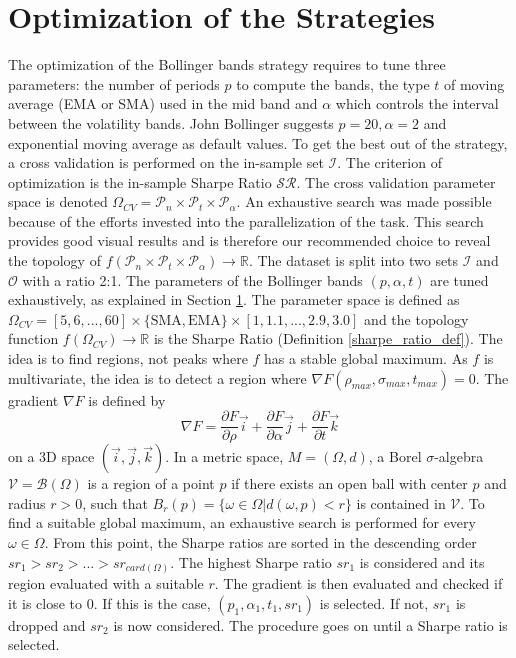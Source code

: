 \documentclass[11pt,a4,twosided,singlespacing,titlepagenumber=on]{scrreprt}
\numberwithin{equation}{chapter} %
\theoremstyle{remark}
\begin{document}
\section{Optimization of the Strategies}
\label{sec:optimization_strategy}
The optimization of the Bollinger bands strategy requires to tune three parameters: the number of periods $p$ to compute the bands, the type $t$ of moving average (EMA or SMA) used in the mid band and $\alpha$ which controls the interval between the volatility bands. John Bollinger suggests $p = 20, \alpha = 2$ and exponential moving average as default values. To get the best out of the strategy, a cross validation is performed on the in-sample set $\mathcal{I}$. The criterion of optimization is the in-sample Sharpe Ratio $\mathcal{SR}$. The cross validation parameter space is denoted  $\Omega_{CV} = \mathcal{P}_n \times \mathcal{P}_t \times \mathcal{P}_\alpha$. An exhaustive search was made possible because of the efforts invested into the parallelization of the task. This search provides good visual results and is therefore our recommended choice to reveal the topology of $f(\mathcal{P}_n \times \mathcal{P}_t \times \mathcal{P}_\alpha) \rightarrow \mathbb{R}$. The dataset is split into two sets $\mathcal{I}$ and $\mathcal{O}$ with a ratio 2:1. The parameters of the Bollinger bands $(p, \alpha, t)$ are tuned exhaustively, as explained in Section \ref{sec:optimization_strategy}. The parameter space is defined as $\Omega_{CV}  = [5,6,...,60] \times \{\text{SMA}, \text{EMA}\} \times [1,1.1,...,2.9,3.0]$ and the topology function $f(\Omega_{CV}) \rightarrow \mathbb{R}$ is the Sharpe Ratio (Definition \ref{sharpe_ratio_def}). The idea is to find regions, not peaks where $f$ has a stable global maximum. As $f$ is multivariate, the idea is to detect a region where $\nabla F(\rho_{max}, \sigma_{max}, t_{max}) = 0$. The gradient $\nabla F$ is defined by
\begin{equation}
\nabla F = \frac{\partial F}{\partial \rho} \vec{i} + \frac{\partial F}{\partial \alpha} \vec{j} + \frac{\partial F}{\partial t} \vec{k}
\end{equation}
on a 3D space $(\vec{i}, \vec{j}, \vec{k})$. In a metric space, $M = (\Omega, d)$, a Borel $\sigma$-algebra $\mathcal{V} = \mathcal{B}(\Omega)$ is a region of a point $p$ if there exists an open ball with center $p$ and radius $r > 0$, such that $B_r(p) = \{\omega \in \Omega | d(\omega, p) < r\}$ is contained in $\mathcal{V}$. To find a suitable global maximum, an exhaustive search is performed for every $\omega \in \Omega$. From this point, the Sharpe ratios are sorted in the descending order $sr_1 > sr_2 > ... > sr_{card(\Omega)}$. The highest Sharpe ratio $sr_1$ is considered and its region evaluated with a suitable $r$. The gradient is then evaluated and checked if it is close to 0. If this is the case, $(p_1, \alpha_1, t_1, sr_1)$ is selected. If not, $sr_1$ is dropped and $sr_2$ is now considered. The procedure goes on until a Sharpe ratio is selected.
 
\end{document}
